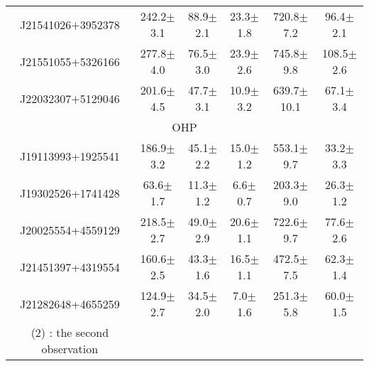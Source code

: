 \documentclass[printer]{aa} %
\begin{document}
\begin{table*}
\begin{tabular}{c c c c c c}
 J21541026$+$3952378  & 242.2$\pm$3.1 & 88.9$\pm$2.1 & 23.3$\pm$1.8 & 720.8$\pm$7.2 & 96.4$\pm$2.1\\ 
 J21551055$+$5326166  & 277.8$\pm$4.0 & 76.5$\pm$3.0 & 23.9$\pm$2.6 & 745.8$\pm$9.8 & 108.5$\pm$2.6\\ 
 J22032307$+$5129046  & 201.6$\pm$4.5 & 47.7$\pm$3.1 & 10.9$\pm$3.2 & 639.7$\pm$10.1 & 67.1$\pm$3.4\\ 
\hline
\multicolumn{6}{c}{OHP}\\
\hline
J19113993+1925541 & 186.9$\pm$3.2 & 45.1$\pm$2.2 & 15.0$\pm$1.2 & 553.1$\pm$9.7 & 33.2$\pm$3.3\\ 
J19302526+1741428 & 63.6$\pm$1.7 & 11.3$\pm$1.2 & 6.6$\pm$0.7 & 203.3$\pm$9.0 & 26.3$\pm$1.2\\ 
J20025554+4559129 & 218.5$\pm$2.7 & 49.0$\pm$2.9 & 20.6$\pm$1.1 & 722.6$\pm$9.7 & 77.6$\pm$2.6\\ 
J21451397+4319554 & 160.6$\pm$2.5 & 43.3$\pm$1.6 & 16.5$\pm$1.1 &472.5$\pm$7.5 & 62.3$\pm$1.4\\
J21282648+4655259& 124.9$\pm$2.7 & 34.5$\pm$2.0 & 7.0$\pm$1.6 & 251.3$\pm$5.8 & 60.0$\pm$1.5\\
\hline       
(2) : the second observation                            
\end{tabular}
\end{table*}

 


\newpage
\onecolumn
\end{document}
